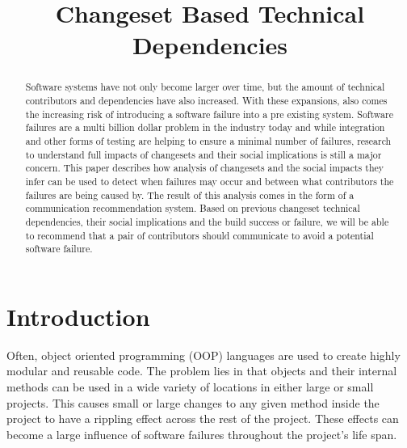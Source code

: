 \documentclass[conference]{IEEEtran}
\begin{document}
\title{Changeset Based Technical Dependencies}

\author{
\and
{}
\and
{}
}

\maketitle


\begin{abstract}
Software systems have not only become larger over time, but the amount of
technical contributors and dependencies have also increased. With these expansions, also comes
the increasing risk of introducing a software failure into a pre existing system.
Software failures are a multi billion dollar problem in the industry today and while integration and
other forms of testing are helping to ensure a minimal number of failures, research to understand
full impacts of changesets and their social implications is still a major concern. This paper describes
how analysis of changesets and the social impacts they infer can be used to detect when failures 
may occur and between what contributors the failures are being caused by. The result of this
analysis comes in the form of a communication recommendation system. Based on previous
changeset technical dependencies, their social implications and the build success or failure, 
we will be able to recommend that a pair of contributors should communicate to avoid a potential
software failure.
\end{abstract}


\section{Introduction}
Often, object oriented programming (OOP) languages are used to create highly modular and 
reusable code. The problem lies in that objects and their internal methods can be used in a wide
variety of locations in either large or small projects. This causes small or large changes to any 
given method inside the project to have a rippling effect across the rest of the project. These 
effects can become a large influence of software failures throughout the project's life span.
\end{document}
